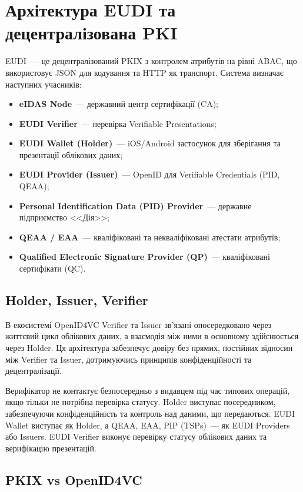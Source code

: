 \newpage
\section{Архітектура EUDI та децентралізована PKI}

EUDI~--- це децентралізований PKIX з контролем атрибутів на рівні ABAC, що використовує JSON
для кодування та HTTP як транспорт. Система визначає наступних учасників:

\begin{itemize}
    \item \textbf{eIDAS Node}~--- державний центр сертифікації (CA);
    \item \textbf{EUDI Verifier}~--- перевірка Verifiable Presentations;
    \item \textbf{EUDI Wallet (Holder)}~--- iOS/Android застосунок для зберігання та презентації
          облікових даних;
    \item \textbf{EUDI Provider (Issuer)}~--- OpenID для Verifiable Credentials (PID, QEAA);
    \item \textbf{Personal Identification Data (PID) Provider}~--- державне підприємство <<Дія>>;
    \item \textbf{QEAA / EAA}~--- кваліфіковані та некваліфіковані атестати атрибутів;
    \item \textbf{Qualified Electronic Signature Provider (QP)}~--- кваліфіковані сертифікати (QC).
\end{itemize}

\subsection{Holder, Issuer, Verifier}

В екосистемі OpenID4VC Verifier та Issuer зв'язані опосередковано через життєвий цикл облікових
даних, а взаємодія між ними в основному здійснюється через Holder. Ця архітектура забезпечує
довіру без прямих, постійних відносин між Verifier та Issuer, дотримуючись принципів
конфіденційності та децентралізації.

Верифікатор не контактує безпосередньо з видавцем під час типових операцій, якщо тільки не
потрібна перевірка статусу. Holder виступає посередником, забезпечуючи конфіденційність та
контроль над даними, що передаються. EUDI Wallet виступає як Holder, а QEAA, EAA, PIP (TSPs)~---
як EUDI Providers або Issuers. EUDI Verifier виконує перевірку статусу облікових даних та
верифікацію презентацій.

\subsection{PKIX vs OpenID4VC}

